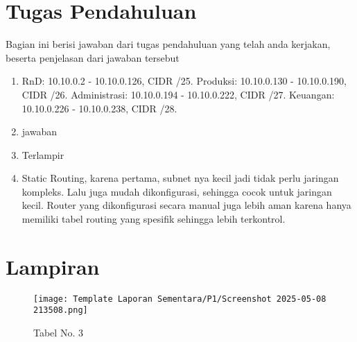 \section{Tugas Pendahuluan}
Bagian ini berisi jawaban dari tugas pendahuluan yang telah anda kerjakan, beserta penjelasan dari jawaban tersebut
\begin{enumerate}
	\item RnD: 10.10.0.2 - 10.10.0.126, CIDR /25. Produksi: 10.10.0.130 - 10.10.0.190, CIDR /26. Administrasi: 10.10.0.194 - 10.10.0.222, CIDR /27. Keuangan: 10.10.0.226 - 10.10.0.238, CIDR /28.
	\item jawaban
	\item Terlampir 
        \item Static Routing, karena pertama, subnet nya kecil jadi tidak perlu jaringan kompleks. Lalu juga mudah dikonfigurasi, sehingga cocok untuk jaringan kecil. Router yang dikonfigurasi secara manual juga lebih aman karena hanya memiliki tabel routing yang spesifik sehingga lebih terkontrol.
\end{enumerate}
\section{Lampiran}
\begin{figure}
    \centering
    \texttt{[image: Template Laporan Sementara/P1/Screenshot 2025-05-08 213508.png]}
    \caption{Tabel No. 3}
    \label{fig:enter-label}
\end{figure}

